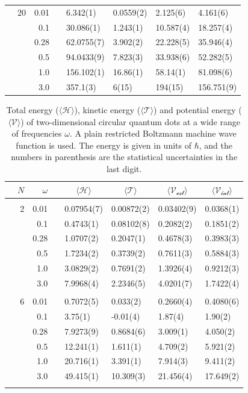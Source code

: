 \begin{table}
\begin{tabularx}{\textwidth}{R{1.5cm}rrcR{2.3cm}R{2.3cm}R{2.3cm}R{2.3cm}}
		&20 & 0.01 && 6.342(1) & 0.0559(2) & 2.125(6) & 4.161(6) \\
		&& 0.1 && 30.086(1) & 1.243(1) & 10.587(4) & 18.257(4) \\
		&& 0.28 && 62.0755(7) & 3.902(2) & 22.228(5) & 35.946(4) \\
		&& 0.5 && 94.0433(9) & 7.823(3) & 33.938(6) & 52.282(5) \\
		&& 1.0 && 156.102(1) & 16.86(1) & 58.14(1) & 81.098(6) \\
		&& 3.0 && 357.1(3) & 6(15) & 194(15) & 156.751(9) \\ \hline \hline
	\end{tabularx}
\end{table} 

\begin{table}
	\caption{Total energy ($\langle\mathcal{H}\rangle$), kinetic energy ($\langle\mathcal{T}\rangle$) and potential energy ($\langle\mathcal{V}\rangle$) of two-dimensional circular quantum dots at a wide range of frequencies $\omega$. A plain restricted Boltzmann machine wave function is used. The energy is given in units of $\hbar$, and the numbers in parenthesis are the statistical uncertainties in the last digit.}
	\label{tab:splitfrequencyQDRBM}
	\begin{tabularx}{\textwidth}{R{1.5cm}rrcR{2.3cm}R{2.3cm}R{2.3cm}R{2.3cm}} \hline\hline
		& & $\omega$ &&  &  &  &  \\ \hline \\
		&2 & 0.01 && 0.07954(7) & 0.00872(2) & 0.03402(9) & 0.0368(1) \\
		&& 0.1 && 0.4743(1) & 0.08102(8) & 0.2082(2) & 0.1851(2) \\
		&& 0.28 && 1.0707(2) & 0.2047(1) & 0.4678(3) & 0.3983(3) \\
		&& 0.5 && 1.7234(2) & 0.3739(2) & 0.7611(3) & 0.5884(3)\\
		&& 1.0 && 3.0829(2) & 0.7691(2) & 1.3926(4) & 0.9212(3)\\
		&& 3.0 && 7.9968(4) & 2.2346(5) & 4.0201(7) & 1.7422(4) \\ \hdashline \\
		
		&6 & 0.01 && 0.7072(5) & 0.033(2) & 0.2660(4) & 0.4080(6) \\
		&& 0.1 && 3.75(1) & -0.01(4) & 1.87(4) & 1.90(2) \\
		&& 0.28 && 7.9273(9) & 0.8684(6) & 3.009(1) & 4.050(2) \\
		&& 0.5 && 12.241(1) & 1.611(1) & 4.709(2) & 5.921(2)\\
		&& 1.0 && 20.716(1) & 3.391(1) & 7.914(3) & 9.411(2)\\
		&& 3.0 && 49.415(1) & 10.309(3) & 21.456(4) & 17.649(2) \\ \hdashline \\
		

\end{tabularx}
\end{table}
